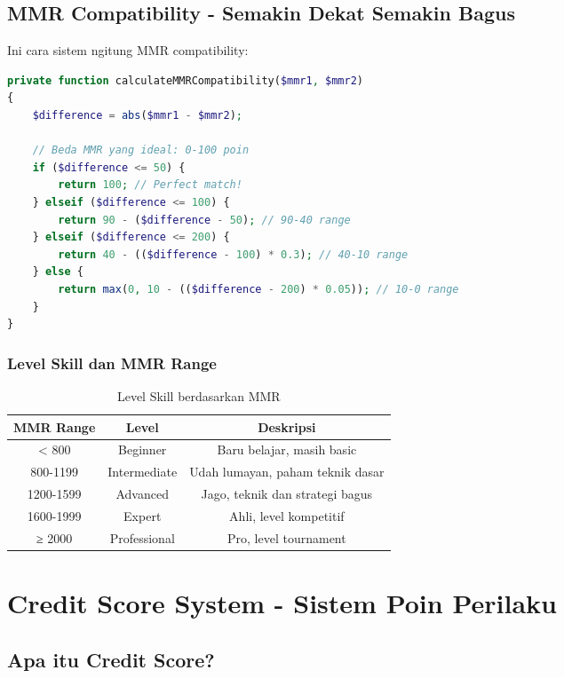 \documentclass[12pt]{article}
\begin{document}
\subsection{MMR Compatibility - Semakin Dekat Semakin Bagus}

Ini cara sistem ngitung MMR compatibility:

\begin{lstlisting}[language=PHP, caption=MMR Compatibility Calculation]
private function calculateMMRCompatibility($mmr1, $mmr2)
{
    $difference = abs($mmr1 - $mmr2);
    
    // Beda MMR yang ideal: 0-100 poin
    if ($difference <= 50) {
        return 100; // Perfect match!
    } elseif ($difference <= 100) {
        return 90 - ($difference - 50); // 90-40 range
    } elseif ($difference <= 200) {
        return 40 - (($difference - 100) * 0.3); // 40-10 range
    } else {
        return max(0, 10 - (($difference - 200) * 0.05)); // 10-0 range
    }
}
\end{lstlisting}

\subsubsection{Level Skill dan MMR Range}

\begin{table}[H]
\centering
\begin{tabular}{|c|c|c|}
\hline
\textbf{MMR Range} & \textbf{Level} & \textbf{Deskripsi} \\
\hline
< 800 & Beginner & Baru belajar, masih basic \\
800-1199 & Intermediate & Udah lumayan, paham teknik dasar \\
1200-1599 & Advanced & Jago, teknik dan strategi bagus \\
1600-1999 & Expert & Ahli, level kompetitif \\
≥ 2000 & Professional & Pro, level tournament \\
\hline
\end{tabular}
\caption{Level Skill berdasarkan MMR}
\end{table}

\section{Credit Score System - Sistem Poin Perilaku}

\subsection{Apa itu Credit Score?}
\end{document}
